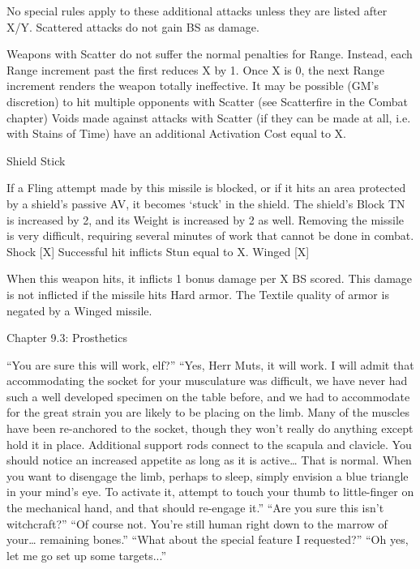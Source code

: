\documentclass[oneside,11pt,english]{book}
\begin{document}
 

 No special rules apply to these additional attacks unless they are listed after X/Y. Scattered attacks do 
not gain BS as damage. 

 

Weapons with Scatter do not suffer the normal penalties for Range. Instead, each Range increment 
past the first reduces X by 1. Once X is 0, the next Range increment renders the weapon totally 
ineffective. It may be possible (GM’s discretion) to hit multiple opponents with Scatter (see 
Scatterfire in the Combat chapter) 
Voids made against attacks with Scatter (if they can be made at all, i.e. with Stains of Time) have an 
additional Activation Cost equal to X. 

Shield 
Stick 

If a Fling attempt made by this missile is blocked, or if it hits an area protected by a shield’s passive 
AV, it becomes ‘stuck’ in the shield. The shield’s Block TN is increased by 2, and its Weight is 
increased by 2 as well. Removing the missile is very difficult, requiring several minutes of work that 
cannot be done in combat. 
Shock [X] Successful hit inflicts Stun equal to X. 
Winged 
[X] 

When this weapon hits, it inflicts 1 bonus damage per X BS scored. This damage is not inflicted if the 
missile hits Hard armor. The Textile quality of armor is negated by a Winged missile. 

 

Chapter 9.3: Prosthetics 

 

“You are sure this will work, elf?” 
“Yes, Herr Muts, it will work. I will admit that accommodating the socket for your musculature was difficult, we have never had 
such a well developed specimen on the table before, and we had to accommodate for the great strain you are likely to be placing 
on the limb. Many of the muscles have been re-anchored to the socket, though they won’t really do anything except hold it in 
place. Additional support rods connect to the scapula and clavicle. You should notice an increased appetite as long as it is 
active… That is normal. When you want to disengage the limb, perhaps to sleep, simply envision a blue triangle in your mind’s 
eye. To activate it, attempt to touch your thumb to little-finger on the mechanical hand, and that should re-engage it.” 
“Are you sure this isn’t witchcraft?” 
“Of course not. You’re still human right down to the marrow of your… remaining bones.” 
“What about the special feature I requested?” 
“Oh yes, let me go set up some targets...” 
\end{document}
